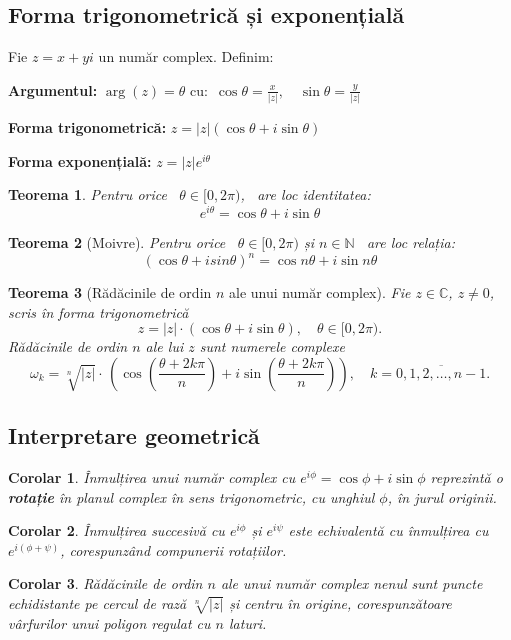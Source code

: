 \documentclass[11pt,a4paper]{article}
\newtheorem{theorem}{Teorema}
\newtheorem{corollary}{Corolar}[subsection]
\begin{document}
\subsection{Forma trigonometrică și exponențială}
Fie \(z = x + yi\) un număr complex. Definim:

 \textbf{Argumentul:} \qquad
$\arg(z)=\theta$ cu: \,$
\cos \theta = \frac{x}{|z|}, \quad \sin \theta = \frac{y}{|z|}$

 \textbf{Forma trigonometrică:} \qquad $
z = |z|(\cos\theta + i\sin\theta) $

\textbf{Forma exponențială:} \qquad $
z = |z| e^{i\theta}$
\begin{theorem}
Pentru orice \, $\theta \in [0, 2\pi)$, \, are loc identitatea:
$$e^{i\theta} = \cos\theta + i\sin\theta$$
\end{theorem}
\begin{theorem}[Moivre]
Pentru orice \, $\theta \in [0, 2\pi)$  și $n \in \mathbb{N}$ \, are loc relația:
 $$\left(\cos\theta+isin\theta\right)^n = \cos{n\theta}+i\sin{n\theta} $$
\end{theorem}
\begin{theorem}[Rădăcinile de ordin $n$ ale unui număr complex]
Fie $z \in \mathbb{C}$, $z \neq 0$, scris în forma trigonometrică
\[
z = |z|\cdot(\cos\theta+i\sin\theta), \quad \theta \in [0, 2\pi).
\]
Rădăcinile de ordin $n$ ale lui $z$ sunt numerele complexe
\[
\omega_k = \sqrt[n]{|z|}\cdot\, \left( \cos \left( \frac{\theta + 2k\pi}{n}\right)+i\sin\left(\frac{\theta + 2k\pi}{n}\right)\right), 
\quad k = \overline{0,1,2,\dots,n-1}.
\]
\end{theorem}

\subsection{Interpretare geometrică}
\begin{corollary}
Înmulțirea unui număr complex cu $e^{i\phi}=\cos\phi+i\sin\phi$ reprezintă o \textbf{rotație} în planul complex în sens trigonometric, cu unghiul $\phi$, în jurul originii.
\end{corollary}
\begin{corollary}
Înmulțirea succesivă cu $e^{i\phi}$ și $e^{i\psi}$ este echivalentă cu
înmulțirea cu $e^{i(\phi+\psi)}$, corespunzând compunerii rotațiilor.
\end{corollary}
\begin{corollary}
Rădăcinile de ordin $n$ ale unui număr complex nenul sunt puncte echidistante
pe cercul de rază $\sqrt[n]{|z|}$ și centru în origine, corespunzătoare
vârfurilor unui poligon regulat cu $n$ laturi.
\end{corollary}
\setcounter{theorem}{0}
\end{document}
